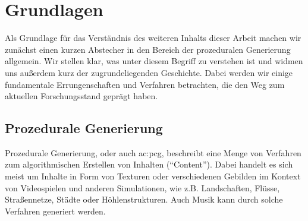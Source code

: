 %
%
%
%
%
%
%
%
%
%
%
%
%

\chapter{Grundlagen}
Als Grundlage für das Verständnis des weiteren Inhalts dieser Arbeit machen wir zunächst einen kurzen Abstecher in den
Bereich der prozeduralen Generierung allgemein. Wir stellen klar, was unter diesem Begriff zu verstehen ist und widmen
uns außerdem kurz der zugrundeliegenden Geschichte. Dabei werden wir einige fundamentale Errungenschaften und Verfahren
betrachten, die den Weg zum aktuellen Forschungsstand geprägt haben.

\section{Prozedurale Generierung}
Prozedurale Generierung, oder auch \gls{ac:pcg}, beschreibt eine Menge von Verfahren zum algorithmischen Erstellen von
Inhalten (``Content''). Dabei handelt es sich meist um Inhalte in Form von Texturen oder verschiedenen Gebilden im Kontext
von Videospielen und anderen Simulationen, wie z.B. Landschaften, Flüsse, Straßennetze, Städte oder Höhlenstrukturen.
\cite{14_carli_et_al} Auch Musik kann durch solche Verfahren generiert werden. \cite{28_ramanto_maulidevi}

